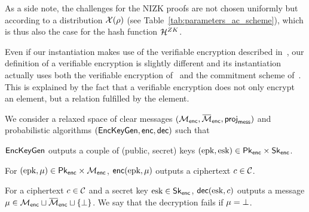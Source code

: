 
As a side note, the challenges for the NIZK proofs are not chosen 
uniformly but according to a distribution $\mathcal{X}(\rho)$ (see
 Table~\ref{tab:parameters_ac_scheme}), which is thus also the case for the
hash function $\mathcal{H}^{ZK}$.




\label{sec:relaxed_verifiable_encryption} Even if our 
instantiation makes use of the verifiable encryption 
described in~\cite{EC:LyuNev17}, our definition of a verifiable encryption is 
slightly different and its instantiation  actually uses both the 
verifiable encryption of~\cite{EC:LyuNev17} and the commitment scheme 
of~\cite{C:AttLyuSei20}. This is explained by the fact that a 
verifiable encryption does not only encrypt an element, but a relation 
fulfilled by the element.


We consider a relaxed space of clear messages $(\SetMessEnc, 
\SetRelMessEnc,\allowbreak \projenc)$ and probabilistic algorithms $(\mathsf{EncKeyGen}, 
\textsf{enc}, \textsf{dec})$ such that
	\begin{compactitem}

		\item $\mathsf{EncKeyGen}$ outputs a couple of (public, secret)
keys $(\text{epk}, \text{esk}) \in \mathsf{Pk}_{\mathsf{enc}} \times \mathsf{Sk}_{\mathsf{enc}}$.

		 \item For $(\text{epk}, \mu) \in \mathsf{Pk}_{\mathsf{enc}} \times 
\mathcal{M}_{\mathsf{enc}}$, $\textsf{enc}(\text{epk}, \mu)$ outputs a ciphertext $c \in 
\mathcal{C}$.

		 \item For a ciphertext $c \in \mathcal{C}$ and a 
secret key $\text{esk} \in \mathsf{Sk}_{\mathsf{enc}}$, $\textsf{dec}(\text{esk}, c)$ outputs a 
message $\mess \in \SetMessEnc \sqcup \SetRelMessEnc \sqcup \{\bot\}$. 
We say that the decryption fails if $\mu = \bot$.

	\end{compactitem}

